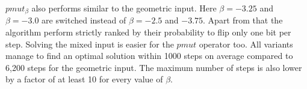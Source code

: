 $pmut_\beta$ also performs similar to the geometric input.
Here $\beta=-3.25$ and $\beta=-3.0$ are switched instead of $\beta = -2.5$ and $-3.75$.
Apart from that the algorithm perform strictly ranked by their probability to flip only one bit per step.
Solving the mixed input is easier for the $pmut$ operator too.
All variants manage to find an optimal solution within 1000 steps on average compared to 6,200 steps for the geometric input.
The maximum number of steps is also lower by a factor of at least 10 for every value of $\beta$.